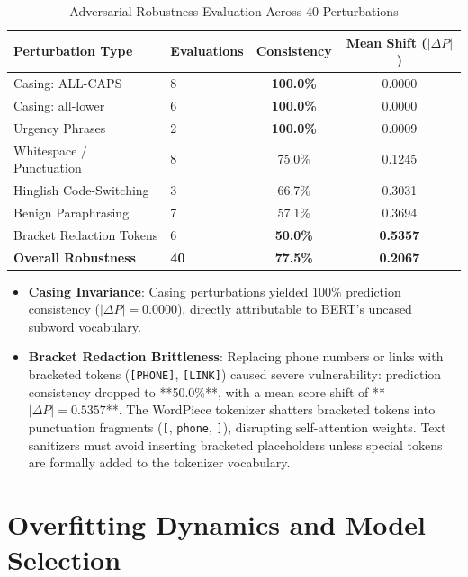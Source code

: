 \documentclass[conference]{IEEEtran}
\begin{document}
\begin{table}[t]
\caption{Adversarial Robustness Evaluation Across 40 Perturbations}
\label{tab:robustness_results}
\centering
\begin{tabularx}{\columnwidth}{lXcc}
\toprule
\textbf{Perturbation Type} & \textbf{Evaluations} & \textbf{Consistency} & \textbf{Mean Shift ($|\Delta P|$)} \\
\midrule
Casing: ALL-CAPS & 8 & \textbf{100.0\%} & 0.0000 \\
Casing: all-lower & 6 & \textbf{100.0\%} & 0.0000 \\
Urgency Phrases & 2 & \textbf{100.0\%} & 0.0009 \\
Whitespace / Punctuation & 8 & 75.0\% & 0.1245 \\
Hinglish Code-Switching & 3 & 66.7\% & 0.3031 \\
Benign Paraphrasing & 7 & 57.1\% & 0.3694 \\
Bracket Redaction Tokens & 6 & \textbf{50.0\%} & \textbf{0.5357} \\
\midrule
\textbf{Overall Robustness} & \textbf{40} & \textbf{77.5\%} & \textbf{0.2067} \\
\bottomrule
\end{tabularx}
\end{table}

\begin{itemize}
    \item \textbf{Casing Invariance}: Casing perturbations yielded 100\% prediction consistency ($|\Delta P| = 0.0000$), directly attributable to BERT's uncased subword vocabulary.
    \item \textbf{Bracket Redaction Brittleness}: Replacing phone numbers or links with bracketed tokens (\texttt{[PHONE]}, \texttt{[LINK]}) caused severe vulnerability: prediction consistency dropped to **50.0\%**, with a mean score shift of **$|\Delta P| = 0.5357$**. The WordPiece tokenizer shatters bracketed tokens into punctuation fragments (\texttt{[}, \texttt{phone}, \texttt{]}), disrupting self-attention weights. Text sanitizers must avoid inserting bracketed placeholders unless special tokens are formally added to the tokenizer vocabulary.
\end{itemize}

\section{Overfitting Dynamics and Model Selection}
\label{sec:overfitting_selection}
\end{document}
